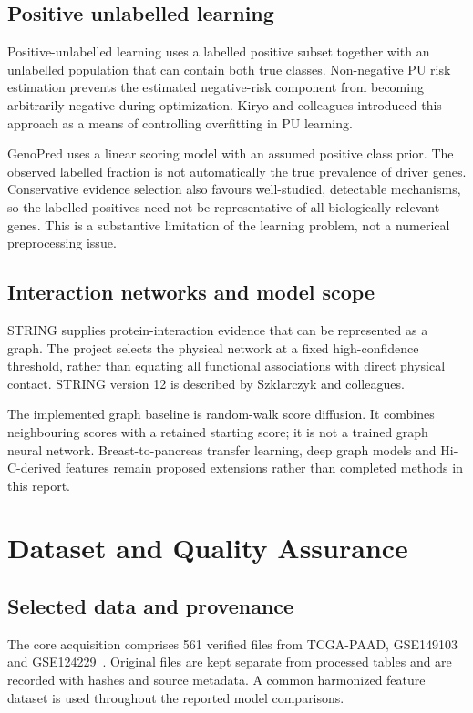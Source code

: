 \documentclass[12pt,a4paper,oneside]{report}
\begin{document}
\section{Positive unlabelled learning}
Positive-unlabelled learning uses a labelled positive subset together with an unlabelled population that can contain both true classes. Non-negative PU risk estimation prevents the estimated negative-risk component from becoming arbitrarily negative during optimization. Kiryo and colleagues introduced this approach as a means of controlling overfitting in PU learning.~\cite{ref10}

GenoPred uses a linear scoring model with an assumed positive class prior. The observed labelled fraction is not automatically the true prevalence of driver genes. Conservative evidence selection also favours well-studied, detectable mechanisms, so the labelled positives need not be representative of all biologically relevant genes. This is a substantive limitation of the learning problem, not a numerical preprocessing issue.

\section{Interaction networks and model scope}
STRING supplies protein-interaction evidence that can be represented as a graph. The project selects the physical network at a fixed high-confidence threshold, rather than equating all functional associations with direct physical contact. STRING version 12 is described by Szklarczyk and colleagues.~\cite{ref11}

The implemented graph baseline is random-walk score diffusion. It combines neighbouring scores with a retained starting score; it is not a trained graph neural network. Breast-to-pancreas transfer learning, deep graph models and Hi-C-derived features remain proposed extensions rather than completed methods in this report.

\chapter{Dataset and Quality Assurance}
\section{Selected data and provenance}
The core acquisition comprises 561 verified files from TCGA-PAAD, GSE149103 and GSE124229~\cite{ref14,ref12,ref13}. Original files are kept separate from processed tables and are recorded with hashes and source metadata. A common harmonized feature dataset is used throughout the reported model comparisons.
\end{document}
